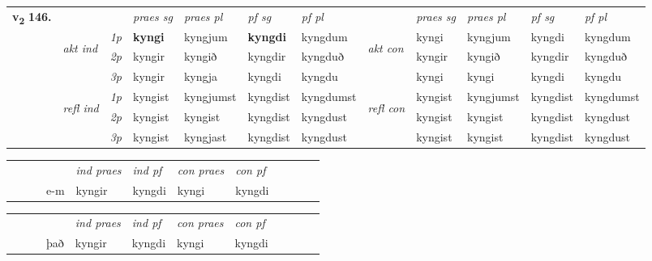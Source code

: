\begin{tabular}{llllllllllll} \toprule
\multirow{4}{*}{{{\textbf{v{\textsubscript{2}}} \Large{\textbf{146.}}}}}  & &   &  \textit{praes sg}  & \textit{praes pl}  &\textit{ pf sg} & \textit{pf pl} &  &  \textit{praes sg}  & \textit{praes pl}  & \textit{pf sg} & \textit{pf pl } \\*
	\cmidrule{4-7} \cmidrule{9-12}
 & \multirow{3}{*}{\begin{turn}{90}\textit{akt ind}\end{turn}} & {\textit{1p}} & \textbf{kyngi} & kyngjum    & \textbf{kyngdi} & kyngdum & \multirow{3}{*}{\begin{turn}{90}\textit{akt con}\end{turn}} &kyngi & kyngjum & kyngdi & kyngdum\\*
& &  {\textit{2p}} &  kyngir  & kyngið   & kyngdir & kyngduð & & kyngir & kyngið & kyngdir & kyngduð \\*
& &  {\textit{3p}} & kyngir & kyngja   & kyngdi & kyngdu & & kyngi & kyngi& kyngdi & kyngdu  \\*
\cmidrule{4-7} \cmidrule{9-12}
 &\multirow{3}{*}{\begin{turn}{90}\textit{refl ind}\end{turn}} & {\textit{1p}} & kyngist & kyngjumst    & kyngdist & kyngdumst & \multirow{3}{*}{\begin{turn}{90}\textit{refl con}\end{turn}}  &kyngist & kyngjumst & kyngdist & kyngdumst\\*
 &&  {\textit{2p}} &  kyngist  & kyngist   & kyngdist & kyngdust & &kyngist & kyngist & kyngdist & kyngdust \\*
& &  {\textit{3p}} & kyngist & kyngjast   & kyngdist & kyngdust & & kyngist & kyngist& kyngdist & kyngdust  \\*
\cmidrule{4-7} \cmidrule{9-12}
\end{tabular}


\begin{tabular}{llllllllllll}
 & &  & &  \textit{ind praes} & \textit{ind pf} & \textit{con praes} & \textit{con pf} \\*
&  & & e-m & kyngir & kyngdi & kyngi & kyngdi \\*
\cmidrule{5-9}
\end{tabular}


\begin{tabular}{llllllllllll}
 & &  & &  \textit{ind praes} & \textit{ind pf} & \textit{con praes} & \textit{con pf} \\*
&  & & það & kyngir & kyngdi & kyngi & kyngdi \\*
\cmidrule{5-9}
\end{tabular}


